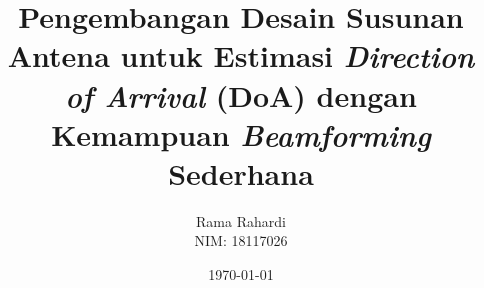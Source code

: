 \documentclass[12pt, a4paper, onecolumn, oneside, final]{report}
\begin{document}
    \title{Pengembangan Desain Susunan Antena untuk Estimasi \textit{Direction of Arrival} (DoA) dengan Kemampuan \textit{Beamforming} Sederhana}
    \date{\today}
    \author{
        Rama Rahardi \\
        NIM: 18117026
    }

    \setcounter{page}{0}

    
    
	
    
    
    
    

    \pagestyle{plain}

    

    \renewcommand*\contentsname{DAFTAR ISI}
    \renewcommand*\appendixtocname{DAFTAR LAMPIRAN}
    \renewcommand*\listfigurename{DAFTAR GAMBAR DAN ILUSTRASI}
    \renewcommand*\listtablename{DAFTAR TABEL}
    \renewcommand*\bibname{DAFTAR PUSTAKA}

    \tableofcontents
    \listofappendices
    {%
		\let\oldnumberline\numberline%
		\renewcommand{\numberline}{\figurename~\oldnumberline}%
		\listoffigures%
	}
	{%
		\let\oldnumberline\numberline%
		\renewcommand{\numberline}{\tablename~\oldnumberline}%
		\listoftables%
	}
	
    
    \renewcommand{\chaptername}{BAB}

    
    
    
    
    
\end{document}
